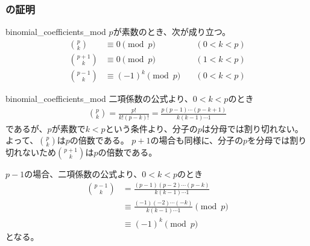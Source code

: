 \subsubsection{の証明}
\begin{Lemm}{}{binomial_coefficients_mod}
$p$が素数のとき、次が成り立つ。
\begin{align}
{p \choose k} &\equiv 0 \pmod{p} \quad &(0 < k < p)\\
\label{eq:binomial_coefficients_mod_p1}
{p+1 \choose k} &\equiv 0 \pmod{p} \quad &(1 < k < p)\\
\label{eq:binomial_coefficients_mod_m1}
{p-1 \choose k} &\equiv (-1)^k \pmod{p} \quad &(0 < k < p)
\end{align}
\end{Lemm}

\begin{lmProof}{binomial_coefficients_mod}
二項係数の公式より、$0<k<p$のとき
\begin{align*}
{p \choose k} = \frac{p!}{k!(p-k)!} = \frac{p(p-1)\cdots(p-k+1)}{k(k-1)\cdots 1}
\end{align*}
であるが、$p$が素数で$k<p$という条件より、分子の$p$は分母では割り切れない。
よって、${p \choose k}$は$p$の倍数である。
$p+1$の場合も同様に、分子の$p$を分母では割り切れないため${p+1 \choose k}$は$p$の倍数である。

$p-1$の場合、二項係数の公式より、$0<k<p$のとき
\begin{align*}
{p-1 \choose k} &= \frac{(p-1)(p-2)\cdots(p-k)}{k(k-1)\cdots 1}\\
 &\equiv \frac{(-1)(-2)\cdots(-k)}{k(k-1)\cdots 1} \pmod{p}\\
 &\equiv (-1)^k \pmod{p}
\end{align*}
となる。
\end{lmProof}


